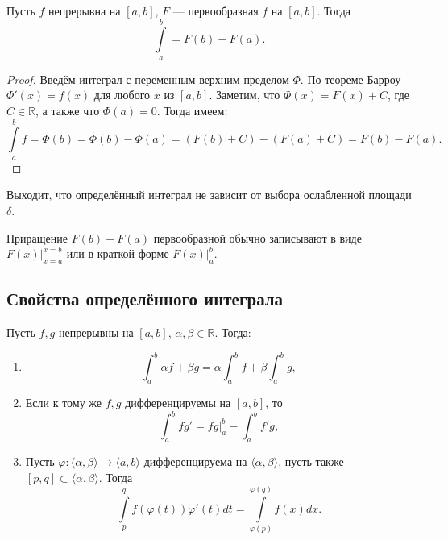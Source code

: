 \hypertarget{Newton}{}
\begin{theorem}
	Пусть $f$ непрерывна на $[a, b]$, $F$ --- первообразная $f$ на $[a, b]$. Тогда \[
		\int\limits_a^b = F(b) - F(a).
	\]
\end{theorem}

\begin{proof}
	Введём интеграл с переменным верхним пределом $\Phi$. По \hyperlink{Barrow}{теореме Барроу} $\Phi'(x) = f(x)$ для любого $x$ из $[a, b]$.
	Заметим, что $\Phi(x) = F(x) + C$, где $C \in \mathbb{R}$, а также что $\Phi(a) = 0$. Тогда имеем: \[
		\int\limits_a^b f = \Phi(b) = \Phi(b) - \Phi(a) = (F(b) + C) - (F(a) + C) = F(b) - F(a). 
	\]
\end{proof}

\begin{remark}
	Выходит, что определённый интеграл не зависит от выбора ослабленной площади $\delta$.
\end{remark}

\begin{remark}
	Приращение $F(b) - F(a)$ первообразной обычно записывают в виде $F(x) \bigg|_{x = a}^{x = b}$ или в краткой форме $F(x) \bigg|_a^b$.
\end{remark}

\subsection{Свойства определённого интеграла}

\begin{theorem}
	Пусть $f, g$ непрерывны на $[a, b]$, $\alpha, \beta \in \mathbb{R}$. Тогда:
	\begin{enumerate}
		\item \[
			\int_a^b \alpha f + \beta g = \alpha \int_a^b f + \beta \int_a^b g,
		\]
		\item Если к тому же $f, g$ дифференцируемы на $[a, b]$, то \[
			\int_a^b fg' = fg \bigg|_a^b - \int_a^b f'g,
		\]
		\item Пусть $\varphi: \langle \alpha, \beta \rangle \to \langle a, b \rangle$ дифференцируема на $\langle \alpha, \beta \rangle$,
		пусть также $[p, q] \subset \langle \alpha, \beta \rangle$. Тогда \[
			\int\limits_p^q f(\varphi(t))\varphi'(t) dt = \int\limits_{\varphi(p)}^{\varphi(q)} f(x) dx.
		\]
	\end{enumerate}
\end{theorem}

